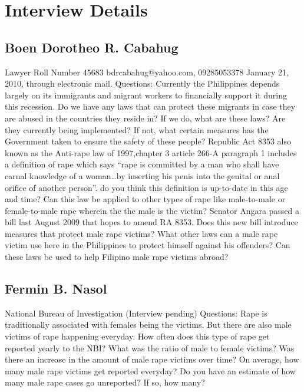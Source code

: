 
\section{Interview Details}
	\subsection{Boen Dorotheo R. Cabahug}	
	\begin{outline}
		\1 Lawyer 
		\1Roll Number 45683
		\1 bdrcabahug@yahoo.com, 09285053378
		\1 January 21, 2010, through electronic mail.
		\1 Questions:
			\2 Currently the Philippines depends largely on its immigrants and migrant workers  to financially support it during this recession. Do we have any laws that can protect these migrants in case they are abused in the countries they reside in?
			\3 If we do, what are these laws? Are they currently being implemented?
			\3 If not, what certain measures has the Government taken to ensure the safety of these people?
			\2 Republic Act 8353 also known as the Anti-rape law of 1997,chapter 3 article 266-A paragraph 1 includes a definition of rape which says ``rape is committed by a man who shall have carnal knowledge of a woman\ldots by inserting his penis into the genital or anal orifice of another person''. do you think this definition is up-to-date in this age and time?
			\3 Can this law be applied to other types of rape like male-to-male or female-to-male rape wherein the the male is the victim?
			\3 Senator Angara passed a bill last August 2009 that hopes to amend RA 8353. Does this new bill introduce measures that protect male rape victims?
			\2 What other laws can a male rape victim use here in the Philippines to protect himself against his offenders?
			\3 Can these laws be used to help Filipino male rape victims abroad?
	\end{outline}
	\subsection{Fermin B. Nasol}
	\begin{outline}
		\1 National Bureau of Investigation
		\1 09278705223
		\1 (Interview pending)
		\1 Questions:
			\2 Rape is traditionally associated with females being the victims. But there are also male victims of rape happening everyday. How often does this type of rape get reported yearly to the NBI? What was the ratio of male to female victims?
			\3 Was there an increase in the amount of male rape victims over time?
			\3 On average, how many male rape victims get reported everyday?
			\4 Do you have an estimate of how many male rape cases go unreported? If so, how many?
	\end{outline}


